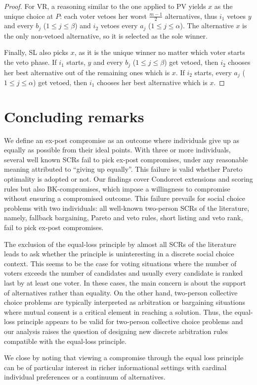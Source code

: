 \documentclass[version=3.21, pagesize, twoside=off, bibliography=totoc, DIV=calc, fontsize=12pt, a4paper]{scrartcl}
\begin{document}
\begin{proof}
	For VR, a reasoning similar to the one applied to PV yields $x$ as the unique choice at $P$: each voter vetoes her worst $\frac{m-1}{2}$ alternatives, thus $i_1$ vetoes $y$ and every $b_j$ ($1 ≤ j ≤ \beta$) and $i_2$ vetoes every $a_j$ ($1 ≤ j ≤ \alpha$). The alternative $x$ is the only non-vetoed alternative, so it is selected as the sole winner.

	Finally, SL also picks $x$, as it is the unique winner no matter which voter starts the veto phase. If $i_1$ starts, $y$ and every $b_j$ ($1 ≤ j ≤ \beta$) get vetoed, then $i_2$ chooses her best alternative out of the remaining ones which is $x$. If $i_2$ starts, every $a_j$ ($1 ≤ j ≤ \alpha$) get vetoed, then $i_1$ chooses her best alternative which is $x$. 
\end{proof}


 
\section{Concluding remarks}

We define an ex-post compromise as an outcome where individuals give up as equally as possible from their ideal points. With three or more individuals, several well known \acp{SCR} fail to pick ex-post compromises, under any reasonable meaning attributed to “giving up equally”. This failure is valid whether Pareto optimality is adopted or not. Our findings cover Condorcet extensions and scoring rules but also BK-compromises, which impose a willingness to compromise without ensuring a compromised outcome. This failure prevails for social choice problems with two individuals: all well-known two-person \acp{SCR} of the literature, namely, fallback bargaining, Pareto and veto rules, short listing and veto rank, fail to pick ex-post compromises.

The exclusion of the equal-loss principle by almost all \acp{SCR} of the literature leads to ask whether the principle is uninteresting in a discrete social choice context. This seems to be the case for voting situations where the number of voters exceeds the number of candidates and usually every candidate is ranked last by at least one voter. In these cases, the main concern is about the support of alternatives rather than equality. On the other hand, two-person collective choice problems are typically interpreted as arbitration or bargaining situations where mutual consent is a critical element in reaching a solution. Thus, the equal-loss principle appears to be valid for two-person collective choice problems and our analysis raises the question of designing new discrete arbitration rules compatible with the equal-loss principle. 

We close by noting that viewing a compromise through the equal loss principle can be of particular interest in richer informational settings with cardinal individual preferences or a continuum of alternatives.




%
\end{document}
